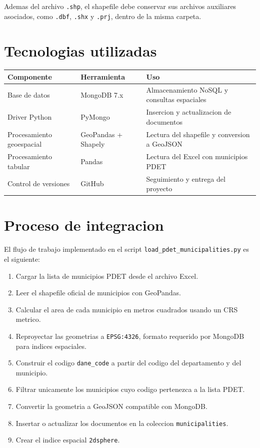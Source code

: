 \documentclass[12pt]{article}
\begin{document}
Ademas del archivo \texttt{.shp}, el shapefile debe conservar sus archivos auxiliares asociados, como \texttt{.dbf}, \texttt{.shx} y \texttt{.prj}, dentro de la misma carpeta.

\section{Tecnologias utilizadas}

\begin{longtable}{|>{\raggedright\arraybackslash}p{4cm}|>{\raggedright\arraybackslash}p{4cm}|>{\raggedright\arraybackslash}p{6cm}|}
\hline
\textbf{Componente} & \textbf{Herramienta} & \textbf{Uso} \\
\hline
Base de datos & MongoDB 7.x & Almacenamiento NoSQL y consultas espaciales \\
\hline
Driver Python & PyMongo & Insercion y actualizacion de documentos \\
\hline
Procesamiento geoespacial & GeoPandas + Shapely & Lectura del shapefile y conversion a GeoJSON \\
\hline
Procesamiento tabular & Pandas & Lectura del Excel con municipios PDET \\
\hline
Control de versiones & GitHub & Seguimiento y entrega del proyecto \\
\hline
\end{longtable}

\section{Proceso de integracion}

El flujo de trabajo implementado en el script \texttt{load\_pdet\_municipalities.py} es el siguiente:

\begin{enumerate}[leftmargin=*]
    \item Cargar la lista de municipios PDET desde el archivo Excel.
    \item Leer el shapefile oficial de municipios con GeoPandas.
    \item Calcular el area de cada municipio en metros cuadrados usando un CRS metrico.
    \item Reproyectar las geometrias a \texttt{EPSG:4326}, formato requerido por MongoDB para indices espaciales.
    \item Construir el codigo \texttt{dane\_code} a partir del codigo del departamento y del municipio.
    \item Filtrar unicamente los municipios cuyo codigo pertenezca a la lista PDET.
    \item Convertir la geometria a GeoJSON compatible con MongoDB.
    \item Insertar o actualizar los documentos en la coleccion \texttt{municipalities}.
    \item Crear el indice espacial \texttt{2dsphere}.
\end{enumerate}
\end{document}
